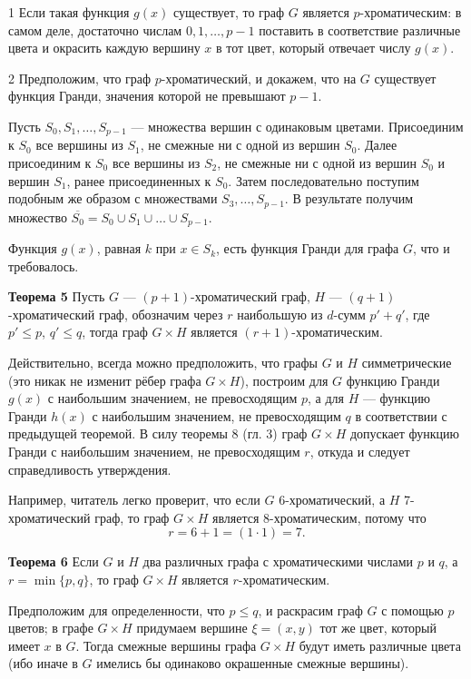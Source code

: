 1\textdegree{} Если такая функция \( g(x) \) существует, то граф \( G \) является \( p \)-хроматическим: в самом деле, достаточно числам \( 0, 1, \ldots, p - 1 \) поставить в соответствие различные цвета и окрасить каждую вершину \( x \) в тот цвет, который отвечает числу \( g(x) \).

2\textdegree{} Предположим, что граф \( p \)-хроматический, и докажем, что на \( G \) существует функция Гранди, значения которой не превышают \( p - 1 \).

Пусть \( S_0, S_1, \ldots, S_{p-1} \) — множества вершин с одинаковым цветами. Присоединим к \( S_0 \) все вершины из \( S_1 \), не смежные ни с одной из вершин \( S_0 \). Далее присоединим к \( S_0 \) все вершины из \( S_2 \), не смежные ни с одной из вершин \( S_0 \) и вершин \( S_1 \), ранее присоединенных к \( S_0 \). Затем последовательно поступим подобным же образом с множествами \( S_3, \ldots, S_{p-1} \). В результате получим множество \( \overline{S_0} = S_0 \cup S_1 \cup \ldots \cup S_{p-1} \).

Функция \( g(x) \), равная \( k \) при \( x \in S_k \), есть функция Гранди для графа \( G \), что и требовалось.

\textbf{Теорема 5} Пусть \( G \) — \((p+1)\)-хроматический граф, \( H \) — \((q+1)\)-хроматический граф, обозначим через \( r \) наибольшую из \( d\)-сумм \( p' + q' \), где \( p' \leq p \), \( q' \leq q \), тогда граф \( G \times H \) является \((r+1)\)-хроматическим.

Действительно, всегда можно предположить, что графы \( G \) и \( H \) симметрические (это никак не изменит рёбер графа \( G \times H \)), построим для \( G \) функцию Гранди \( g(x) \) с наибольшим значением, не превосходящим \( p \), а для \( H \) — функцию Гранди \( h(x) \) с наибольшим значением, не превосходящим \( q \) в соответствии с предыдущей теоремой. В силу теоремы 8 (гл. 3) граф \( G \times H \) допускает функцию Гранди с наибольшим значением, не превосходящим \( r \), откуда и следует справедливость утверждения.

Например, читатель легко проверит, что если \( G \) 6-хроматический, а \( H \) 7-хроматический граф, то граф \( G \times H \) является 8-хроматическим, потому что
\[
r = 6 + 1 = (1 \cdot 1) = 7.
\]

\textbf{Теорема 6} Если \( G \) и \( H \) два различных графа с хроматическими числами \( p \) и \( q \), а \( r = \min\{p, q\} \), то граф \( G \times H \) является \( r \)-хроматическим.

Предположим для определенности, что \( p \leq q \), и раскрасим граф \( G \) с помощью \( p \) цветов; в графе \( G \times H \) придумаем вершине \(\xi = (x, y)\) тот же цвет, который имеет \( x \) в \( G \). Тогда смежные вершины графа \( G \times H \) будут иметь различные цвета (ибо иначе в \( G \) имелись бы одинаково окрашенные смежные вершины).

